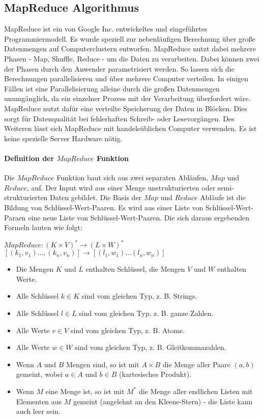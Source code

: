 \newpage
\subsection{MapReduce Algorithmus}
MapReduce ist ein von Google Inc. entwickeltes und eingeführtes Programmiermodell. Es wurde speziell zur nebenläufigen Berechnung über große Datenmengen auf Computerclustern entworfen. MapReduce nutzt dabei mehrere Phasen - Map, Shuffle, Reduce - um die Daten zu verarbeiten. Dabei können zwei der Phasen durch den Anwender parametrisiert werden. So lassen sich die Berechnungen parallelisieren und über mehrere Computer verteilen. In einigen Fällen ist eine Parallelisierung alleine durch die großen Datenmengen unumgänglich, da ein einzelner Prozess mit der Verarbeitung überfordert wäre.\\ MapReduce nutzt dafür eine verteilte Speicherung der Daten in Blöcken. Dies sorgt für Datenqualität bei fehlerhaften Schreib- oder Lesevorgängen. Des Weiteren lässt sich MapReduce mit handelsüblichen Computer verwenden. Es ist keine spezielle Server Hardware nötig.

\paragraph{Definition der $MapReduce$ Funktion}$\;$ \\
Die $MapReduce$ Funktion baut sich aus zwei separaten Abläufen, $Map$ und $Reduce$, auf. Der Input wird aus einer Menge unstrukturierten oder semi-strukturierten Daten gebildet. Die Basis der $Map$ und $Reduce$ Abläufe ist die Bildung von Schlüssel-Wert-Paaren. Es wird aus einer Liste von Schlüssel-Wert-Paraen eine neue Liste von Schlüssel-Wert-Paaren. Die sich daraus ergebenden Formeln lauten wie folgt:

\begin{center}
    $MapReduce: (K \times V)^\ast \rightarrow (L \times W)^\ast$\\$[(k_1, v_1) \dots ,(k_n, v_n)] \rightarrow [(l_1, w_1) \dots (l_n, w_n)]$
\end{center}
\begin{itemize}
    \item Die Mengen $K$ und $L$ enthalten Schlüssel, die Mengen $V$ und $W$ enthalten Werte.
    \item Alle Schlüssel $k \in K$ sind vom gleichen Typ, z. B. Strings.
    \item Alle Schlüssel $l \in L$ sind vom gleichen Typ, z. B. ganze Zahlen.
    \item Alle Werte $v \in V$ sind vom gleichen Typ, z. B. Atome.
    \item Alle Werte $w \in W$ sind vom gleichen Typ, z. B. Gleitkommazahlen.
    \item Wenn $A$ und $B$ Mengen sind, so ist mit $A\times B$ die Menge aller Paare $(a, b)$ gemeint, wobei $a \in A$ und $b \in B$ (kartesisches Produkt).
    \item Wenn $M$ eine Menge ist, so ist mit $M^*$ die Menge aller endlichen Listen mit Elementen aus $M$ gemeint (angelehnt an den Kleene-Stern) - die Liste kann auch leer sein.
\end{itemize}

